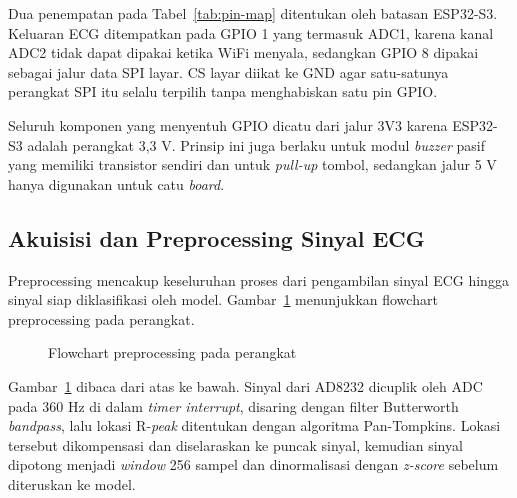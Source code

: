 Dua penempatan pada Tabel~\ref{tab:pin-map} ditentukan oleh batasan ESP32-S3. Keluaran ECG ditempatkan pada GPIO 1 yang termasuk ADC1, karena kanal ADC2 tidak dapat dipakai ketika WiFi menyala, sedangkan GPIO 8 dipakai sebagai jalur data SPI layar. CS layar diikat ke GND agar satu-satunya perangkat SPI itu selalu terpilih tanpa menghabiskan satu pin GPIO.

Seluruh komponen yang menyentuh GPIO dicatu dari jalur 3V3 karena ESP32-S3 adalah perangkat 3,3 V. Prinsip ini juga berlaku untuk modul \textit{buzzer} pasif yang memiliki transistor sendiri dan untuk \textit{pull-up} tombol, sedangkan jalur 5 V hanya digunakan untuk catu \textit{board}.

\subsection{Akuisisi dan Preprocessing Sinyal ECG}

Preprocessing mencakup keseluruhan proses dari pengambilan sinyal ECG hingga sinyal siap diklasifikasi oleh model. Gambar~\ref{fig:alir-preprocessing} menunjukkan flowchart preprocessing pada perangkat.

\begin{figure}[H]
  \centering
  \caption{Flowchart preprocessing pada perangkat}
  \label{fig:alir-preprocessing}
\end{figure}

Gambar~\ref{fig:alir-preprocessing} dibaca dari atas ke bawah. Sinyal dari AD8232 dicuplik oleh ADC pada 360 Hz di dalam \textit{timer interrupt}, disaring dengan filter Butterworth \textit{bandpass}, lalu lokasi R-\textit{peak} ditentukan dengan algoritma Pan-Tompkins. Lokasi tersebut dikompensasi dan diselaraskan ke puncak sinyal, kemudian sinyal dipotong menjadi \textit{window} 256 sampel dan dinormalisasi dengan \textit{z-score} sebelum diteruskan ke model.

